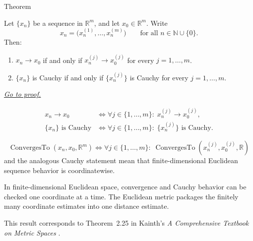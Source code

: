 \begin{theorembox}{Theorem}
\begin{theorem}
\label{thm:metric-euclidean-coordinatewise-sequences}
Let \(\{x_n\}\) be a sequence in \(\mathbb{R}^m\), and let
\(x_0\in\mathbb{R}^m\).  Write
\[
  x_n=\bigl(x_n^{(1)},\ldots,x_n^{(m)}\bigr)
  \qquad\text{for all } n\in\mathbb{N}\cup\{0\}.
\]
Then:
\begin{enumerate}
  \item \(x_n\to x_0\) if and only if
        \(x_n^{(j)}\to x_0^{(j)}\) for every \(j=1,\ldots,m\).
  \item \(\{x_n\}\) is Cauchy if and only if
        \(\{x_n^{(j)}\}\) is Cauchy for every \(j=1,\ldots,m\).
\end{enumerate}

\smallskip
\noindent
\hyperref[prf:metric-euclidean-coordinatewise-sequences]{\textit{Go to proof.}}
\end{theorem}
\end{theorembox}

\begin{remark*}
\[
\begin{aligned}
x_n\to x_0
&\Longleftrightarrow
\forall j\in\{1,\ldots,m\}{:}\; x_n^{(j)}\to x_0^{(j)},\\
\{x_n\}\text{ is Cauchy}
&\Longleftrightarrow
\forall j\in\{1,\ldots,m\}{:}\; \{x_n^{(j)}\}\text{ is Cauchy}.
\end{aligned}
\]
\end{remark*}

\begin{remark*}
\[
\operatorname{ConvergesTo}(x_n,x_0,\mathbb{R}^m)
\Longleftrightarrow
\forall j\in\{1,\ldots,m\}{:}\;
\operatorname{ConvergesTo}(x_n^{(j)},x_0^{(j)},\mathbb{R})
\]
and the analogous Cauchy statement mean that finite-dimensional Euclidean
sequence behavior is coordinatewise.
\end{remark*}

\begin{remark*}[Interpretation]
In finite-dimensional Euclidean space, convergence and Cauchy behavior can be
checked one coordinate at a time.  The Euclidean metric packages the finitely
many coordinate estimates into one distance estimate.
\end{remark*}

\begin{remark*}
This result corresponds to Theorem~2.25 in Kainth's
\emph{A Comprehensive Textbook on Metric Spaces}
\cite{KainthComprehensiveMetricSpaces2023}.
\end{remark*}

